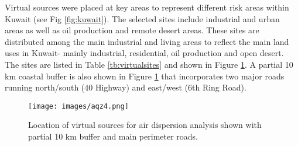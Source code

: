 Virtual sources were placed at key areas to represent different risk areas within Kuwait (see Fig \ref{fig:kuwait}).  The selected sites include industrial and urban areas as well as oil production and remote desert areas. These sites are distributed among the main industrial and living areas to reflect the main land uses in Kuwait- mainly industrial, residential, oil production and open desert.  The sites are listed in Table \ref{tb:virtualsites} and shown in Figure \ref{fig:virtual-locations}. A partial 10 km coastal buffer is also shown in Figure \ref{fig:virtual-locations} that incorporates two major roads running north/south (40 Highway) and east/west (6th Ring Road).
%
\begin{table}[!htb]
\centering
\caption{Virtual Site locations.}
\label{tb:virtualsites}
\end{table}
%
%
\begin{figure}[!htb]
\texttt{[image: images/aqz4.png]} 
\caption[Location of virtual sources]{Location of virtual sources for air dispersion analysis shown with partial 10 km buffer and main perimeter roads.}
\label{fig:virtual-locations}
\end{figure}
%

